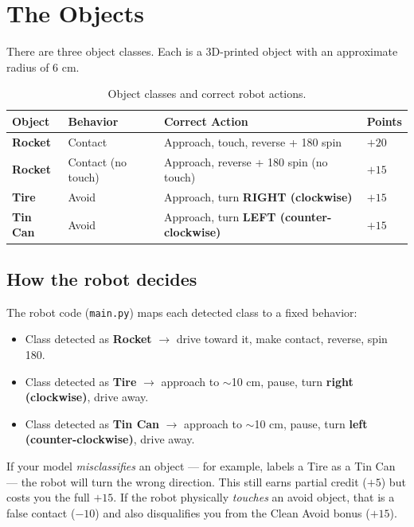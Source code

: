 \documentclass[a4]{article}
\begin{document}
\pagebreak
\section*{The Objects}

There are three object classes. Each is a 3D-printed object with an approximate radius of 6 cm.

\begin{table}[H]
\centering
\begin{tabular}{llll}
\toprule
\textbf{Object} & \textbf{Behavior} & \textbf{Correct Action} & \textbf{Points} \\
\midrule
\textbf{Rocket} & Contact & Approach, touch, reverse + 180\textdegree{} spin & $+20$ \\
\textbf{Rocket} & Contact (no touch) & Approach, reverse + 180\textdegree{} spin (no touch) & $+15$ \\
\textbf{Tire} & Avoid & Approach, turn \textbf{RIGHT (clockwise)} & $+15$ \\
\textbf{Tin Can} & Avoid & Approach, turn \textbf{LEFT (counter-clockwise)} & $+15$ \\
\bottomrule
\end{tabular}
\caption{Object classes and correct robot actions.}
\end{table}

\subsection*{How the robot decides}

The robot code (\texttt{main.py}) maps each detected class to a fixed behavior:
\begin{itemize}
    \item Class detected as \textbf{Rocket} $\rightarrow$ drive toward it, make contact, reverse, spin 180\textdegree.
    \item Class detected as \textbf{Tire} $\rightarrow$ approach to $\sim$10 cm, pause, turn \textbf{right (clockwise)}, drive away.
    \item Class detected as \textbf{Tin Can} $\rightarrow$ approach to $\sim$10 cm, pause, turn \textbf{left (counter-clockwise)}, drive away.
\end{itemize}

If your model \textit{misclassifies} an object --- for example, labels a Tire as a Tin Can --- the robot will turn the wrong direction. This still earns partial credit ($+5$) but costs you the full $+15$. If the robot physically \textit{touches} an avoid object, that is a false contact ($-10$) and also disqualifies you from the Clean Avoid bonus ($+15$).
\end{document}
